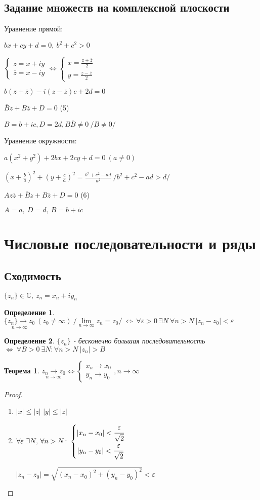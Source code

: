 \documentclass[draft]{report}
\newcommand{\forcenewline}{$\phantom{\mbox{newline}}$}
\renewcommand{\C}{\mathbb{C}}
\newcommand{\LRA}{\Leftrightarrow}
\renewcommand{\bar}{\overline}
\newcommand{\ninf}[1]{\underset{n\to\infty}{#1}}
\newcommand{\e}{\varepsilon}
\newcommand{\z}{\bar{z}}
\newcommand{\sys}[1]{\left\{\begin{matrix}#1\end{matrix}\right.}
\newcommand{\opr}[1]{\begin{opred}#1\end{opred}}
\newtheorem*{theor}{Теорема}
\newtheorem*{opred}{Определение}
\theoremstyle{remark}
\begin{document}
\subsection{Задание множеств на комплексной плоскости}

Уравнение прямой:

$bx+cy+d=0,\ b^2+c^2>0$

$\sys{z=x+iy \\ \z=x-iy}\LRA\sys{x=\frac{z+\bar{z}}{2}\\y=\frac{z-\bar{z}}{2}}$

$b(z+\bar{z})-i(z-\bar{z})c+2d=0$

$\bar{B}z+B\bar{z}+D=0$ (5)

$B=b+ic, D=2d, B\bar{B}\neq0\ /B\neq0/$

Уравнение окружности:

$a(x^2+y^2)+2bx+2cy+d=0\ (a\neq0)$

$\left(x+\frac ba\right)^2+\left(y+\frac ca\right)^2=\frac{b^2+c^2-ad}{a^2}\ /b^2+c^2-ad>d/$

$Az\z+\bar{B}z+B\z+D=0$ (6)

$A=a,\ D=d,\ B=b+ic$

\section{Числовые последовательности и ряды}

\subsection{Сходимость}

$\{z_n\}\in\C,\ z_n=x_n+iy_n$

\opr{$\ninf{\{z_n\}\to z_0}\ (z_0\neq\infty)\ /\ninf{\lim}z_n=z_0/\ \LRA\ \forall \e>0\ \exists N\ \forall n>N\ |z_n-z_0|<\e$
}

\opr{$\{z_n\}$ - бесконечно большая последовательность $\LRA\ \forall B>0\ \exists N\colon \forall n>N\ |z_n|>B$}

\begin{theor}
$\ninf{z_n\to z_0}\LRA\sys{x_n\to x_0 \\ y_n\to y_0},n\to\infty$
\end{theor}

\begin{proof}
\forcenewline
\begin{enumerate}
\item $|x|\leq|z|$
$|y|\leq|z|$
\item $\forall\e\ \exists N,\,\forall n>N\colon
\sys{|x_n-x_0|<\cfrac\e{\sqrt{2}} \\ |y_n-y_0|<\cfrac\e{\sqrt{2}}}$

$|z_n-z_0|=\sqrt{(x_n-x_0)^2+(y_n-y_0)^2}<\e$
\end{enumerate}
\end{proof}
\end{document}

